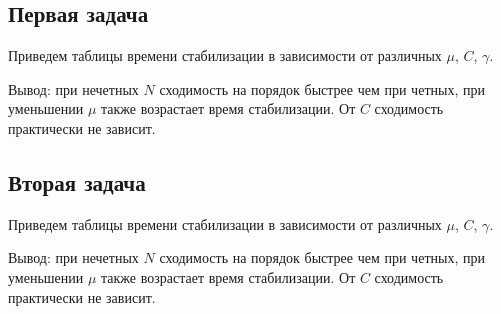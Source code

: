 \subsection{Первая задача}

Приведем таблицы времени стабилизации в зависимости от различных $\mu$, $C$, $\gamma$.








Вывод: при нечетных $N$ сходимость на порядок быстрее чем при четных, при уменьшении $\mu$ также возрастает время стабилизации. От $C$ сходимость практически не зависит.

\subsection{Вторая задача}
Приведем таблицы времени стабилизации в зависимости от различных $\mu$, $C$, $\gamma$.








Вывод: при нечетных $N$ сходимость на порядок быстрее чем при четных, при уменьшении $\mu$ также возрастает время стабилизации. От $C$ сходимость практически не зависит.

\newpage 